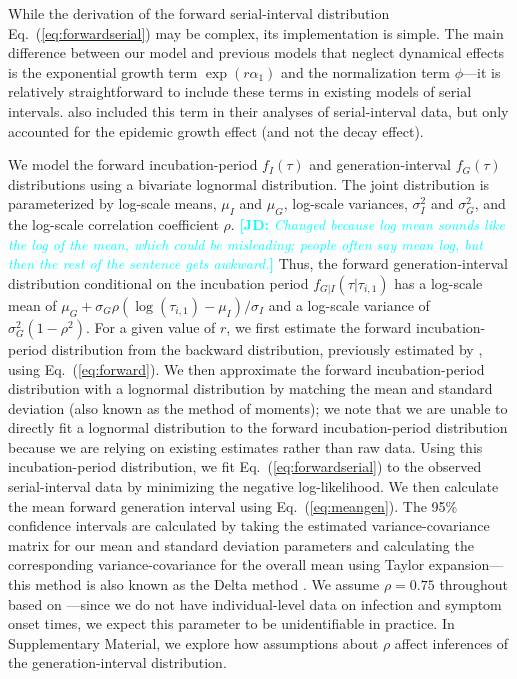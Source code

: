 \documentclass[12pt]{article}
\newcommand{\comment}{\showcomment}
\newcommand{\showcomment}[3]{\textcolor{#1}{\textbf{[#2: }\textsl{#3}\textbf{]}}}
\newcommand{\jd}[1]{\comment{cyan}{JD}{#1}}
\newcommand{\eref}[1]{Eq.~(\ref{eq:#1})}
\begin{document}
While the derivation of the forward serial-interval distribution \eref{forwardserial} may be complex, its implementation is simple.
The main difference between our model and previous models that neglect dynamical effects \citep{ganyani2020estimating,he2020temporal,zhao2021estimating,hart2022generation} is the exponential growth term $\exp(r \alpha_1)$ and the normalization term $\phi$---it is relatively straightforward to include these terms in existing models of serial intervals.
\cite{ferretti2020quantifying, ferretti2020timing} also included this term in their analyses of serial-interval data, but only accounted for the epidemic growth effect (and not the decay effect).

We model the forward incubation-period $f_I(\tau)$ and generation-interval $f_G(\tau)$ distributions using a bivariate lognormal distribution.
The joint distribution is parameterized by log-scale means, $\mu_I$ and $\mu_G$, log-scale variances, $\sigma_I^2$ and $\sigma_G^2$, and the log-scale correlation coefficient $\rho$. \jd{Changed because log mean sounds like the log of the mean, which could be misleading; people often say mean log, but then the rest of the sentence gets awkward.}
Thus, the forward generation-interval distribution conditional on the incubation period $f_{G|I}(\tau|\tau_{i,1})$ has a log-scale mean of $\mu_G + \sigma_G \rho (\log(\tau_{i, 1}) - \mu_I)/\sigma_I$ and a log-scale variance of $\sigma_G^2 (1 - \rho^2)$.
For a given value of $r$, we first estimate the forward incubation-period distribution from the backward distribution, previously estimated by \cite{backer2021omicron}, using \eref{forward}.
We then approximate the forward incubation-period distribution with a lognormal distribution by matching the mean and standard deviation (also known as the method of moments); we note that we are unable to directly fit a lognormal distribution to the forward incubation-period distribution because we are relying on existing estimates rather than raw data.
Using this incubation-period distribution, we fit \eref{forwardserial} to the observed serial-interval data by minimizing the negative log-likelihood.
We then calculate the mean forward generation interval using \eref{meangen}.
The 95\% confidence intervals are calculated by taking the estimated variance-covariance matrix for our mean and standard deviation parameters and calculating the corresponding variance-covariance for the overall mean using Taylor expansion---this method is also known as the Delta method \citep{oehlert1992note}.
We assume $\rho = 0.75$ throughout based on \cite{sender2021unmitigated}---since we do not have individual-level data on infection and symptom onset times, we expect this parameter to be unidentifiable in practice.
In Supplementary Material, we explore how assumptions about $\rho$ affect inferences of the generation-interval distribution.
\end{document}
